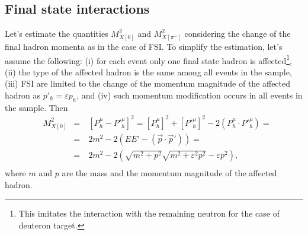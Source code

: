 
\vspace{-0.75em}
\subsection*{Final state interactions}
\vspace{-0.5em}
Let's estimate the quantities $M_{X[0]}^{2}$ and $M_{X[\pi^{-}]}^{2}$ considering the change of the final hadron momenta as in the case of FSI. To simplify the estimation, let's assume the following: (i) for each event only one final state hadron is affected\footnote[5]{This imitates the interaction with the remaining neutron for the case of deuteron target.}, (ii) the type of the affected hadron is the same among all events in the sample, (iii) FSI are limited to the change of the momentum magnitude of the affected hadron as $p'_{h} = \varepsilon p_{h}$, and (iv) such momentum modification occurs in all events in the sample. Then\vspace{-0.5em}
\begin{equation}
\begin{aligned}
&M_{X[0]}^{2}&=&~[P^{\mu}_{h} -P'^{\mu}_{h}]^{2} = [P^{\mu}_{h}]^{2} +[P'^{\mu}_{h}]^{2}-2(P^{\mu}_{h}\cdot P'^{\mu}_{h} )=\\
&&=&~2m^{2}-2(EE' - (\overrightarrow{p}\cdot \overrightarrow{p}'))=\\
&&=&~2m^{2} - 2(\sqrt{m^{2}+p^{2}}\sqrt{m^{2}+\varepsilon^{2}p^{2}}-\varepsilon p^{2}),\\[-7pt]
\end{aligned}\label{eq:mm0_fsi}
\end{equation}
where $m$ and $p$ are the mass and the momentum magnitude of the affected hadron.


